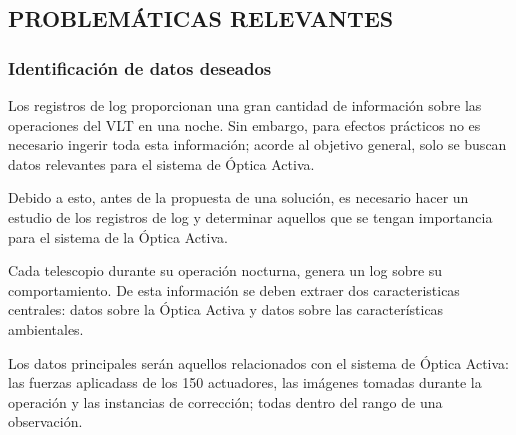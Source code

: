 \subsection{PROBLEMÁTICAS RELEVANTES}

\subsubsection{Identificación de datos deseados}

Los registros de log proporcionan una gran cantidad de información sobre las operaciones del VLT en una noche. Sin embargo, para efectos prácticos no es necesario ingerir toda esta información; acorde al objetivo general, solo se buscan datos relevantes para el sistema de Óptica Activa.

Debido a esto, antes de la propuesta de una solución, es necesario hacer un estudio de los registros de log y determinar aquellos que se tengan importancia para el sistema de la Óptica Activa.

Cada telescopio durante su operación nocturna, genera un log sobre su comportamiento. De esta información se deben extraer dos caracteristicas centrales: datos sobre la Óptica Activa y datos sobre las características ambientales.

Los datos principales serán aquellos relacionados con el sistema de Óptica Activa: las fuerzas aplicadass de los 150 actuadores, las imágenes tomadas durante la operación y las instancias de corrección; todas dentro del rango de una observación.

